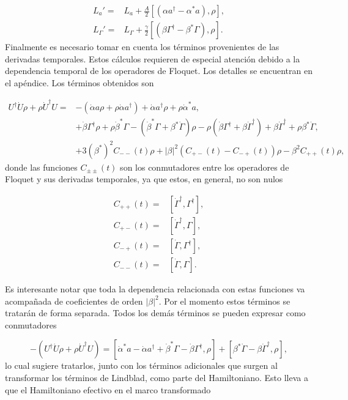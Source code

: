 \documentclass[10pt,a4paper]{report}
\begin{document}
\begin{align}
L_a ' =& L_a + \frac{A}{2}[(\alpha a^\dagger - \alpha^*a),\rho], \\
L_{\Gamma}' =& L_{\Gamma} + \frac{\gamma}{2}[(\beta\Gamma^{\dagger}-\beta^* \Gamma),\rho].
\end{align}Finalmente es necesario tomar en cuenta los términos provenientes de las derivadas temporales. Estos cálculos requieren de especial atención debido a la dependencia temporal de los operadores de Floquet. Los detalles se encuentran en el apéndice. Los términos obtenidos son

\begin{align*}
U^{\dagger}\dot{U}\rho + \rho \dot{U}^\dagger U =& -(\dot{\alpha}a \rho + \rho\dot{\alpha}a^{\dagger}) + \dot{\alpha}a^{\dagger}\rho + \rho \dot{\alpha}^*a,\\
&+ \dot{\beta}\Gamma^{\dagger}\rho + \rho\dot{\beta}^*\Gamma-(\dot{\beta}^*\Gamma + \beta^*\dot{\Gamma})\rho - \rho(\dot{\beta} \Gamma^{\dagger} + \beta \dot{\Gamma}^{\dagger}) +\beta \dot{\Gamma}^{\dagger} + \rho\beta^* \dot{\Gamma},\\
&+3(\beta^*)^2C_{--}(t)\rho + |\beta|^2(C_{+-}(t) - C_{-+}(t))\rho -  \beta^2 C_{++}(t)\rho,
\end{align*}  donde las funciones $C_{\pm \pm}(t)$ son los conmutadores entre los operadores de Floquet y sus derivadas temporales, ya que estos, en general, no son nulos

\begin{align*}
C_{++}(t) =& [\dot{\Gamma}^{\dagger}, \Gamma^{\dagger}],\\
C_{+-}(t) =& [\dot{\Gamma}^{\dagger}, \Gamma],\\
C_{-+}(t) =& [\dot{\Gamma}, \Gamma^{\dagger}],\\
C_{--}(t) =& [\dot{\Gamma}, \Gamma].
\end{align*} 
 
Es interesante notar que toda la dependencia relacionada con estas funciones va acompañada de coeficientes de orden $|\beta|^2$. Por el momento estos términos se tratarán de forma separada. Todos los demás términos se pueden expresar como conmutadores

\begin{equation}
-(U^{\dagger}\dot{U}\rho + \rho \dot{U}^\dagger U) = [\dot{\alpha}^*a-\dot{\alpha}a^\dagger+\dot{\beta}^*\Gamma-\dot{\beta}\Gamma^\dagger,\rho]+ [\beta^*\dot{\Gamma} - \beta \dot{\Gamma}^\dagger,\rho],
\end{equation} lo cual sugiere tratarlos, junto con los términos adicionales que surgen al transformar los términos de Lindblad, como parte del Hamiltoniano. Esto lleva a que el Hamiltoniano efectivo en el marco transformado 
\end{document}
